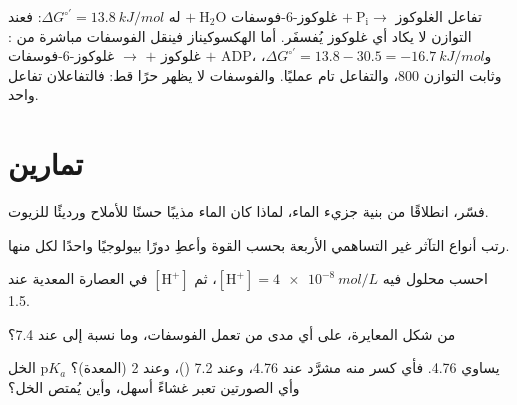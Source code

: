 \begin{example}[الاقتران]\label{ex:b1:water-small-molecules:coupling}
تفاعل الغلوكوز $+\ \mathrm{P_i} \to$ غلوكوز-6-فوسفات
$+\ \mathrm{H_2O}$ له $\Delta G^{\circ\prime} = \qty{+13.8}{kJ/mol}$:
فعند التوازن لا يكاد أي غلوكوز يُفسفَر. أما الهكسوكيناز فينقل
الفوسفات مباشرة من : غلوكوز $+$  $\to$ غلوكوز-6-فوسفات $+$
ADP، و$\Delta G^{\circ\prime} = 13.8 - 30.5 =
\qty{-16.7}{kJ/mol}$،
وثابت التوازن $800$، والتفاعل تام عمليًا. والفوسفات لا يظهر حرًا قط:
فالتفاعلان تفاعل واحد.
\end{example}

\section{تمارين}

\begin{exercise}[$\star$]\label{exo:b1:water-small-molecules:1}
فسّر، انطلاقًا من بنية جزيء الماء، لماذا كان الماء مذيبًا حسنًا
للأملاح ورديئًا للزيوت.
\end{exercise}

\begin{exercise}[$\star$]\label{exo:b1:water-small-molecules:2}
رتب أنواع التآثر غير التساهمي الأربعة بحسب القوة وأعطِ دورًا
بيولوجيًا واحدًا لكل منها.
\end{exercise}

\begin{exercise}[$\star$]\label{exo:b1:water-small-molecules:3}
احسب  محلول فيه $[\mathrm{H^+}] = \qty{4e-8}{mol/L}$، ثم
$[\mathrm{H^+}]$ في العصارة المعدية عند  1.5.
\end{exercise}

\begin{exercise}[$\star$]\label{exo:b1:water-small-molecules:4}
من شكل المعايرة، على أي مدى من  تعمل  الفوسفات، وما نسبة
 إلى  عند  7.4؟
\end{exercise}

\begin{exercise}[$\star\star$]\label{exo:b1:water-small-molecules:5}
 الخل p$K_a$ يساوي 4.76. فأي كسر منه مشرَّد عند  4.76، وعند
 7.2 ()، وعند  2 (المعدة)؟ وأي الصورتين تعبر
غشاءً أسهل، وأين يُمتص  الخل؟
\end{exercise}

